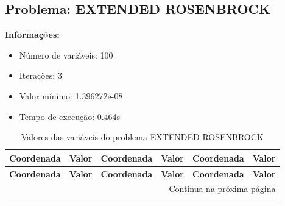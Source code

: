 \documentclass[12pt]{article}
\begin{document}
\newpage            
\subsection{Problema: EXTENDED ROSENBROCK}

\textbf{Informações:}
\begin{itemize}
\item Número de variáveis: 100
\item Iterações: 3
\item Valor mínimo: 1.396272e-08
\item Tempo de execução: 0.464s
\end{itemize}

\small
\begin{longtable}{@{}cc|cc|cc@{}}
\caption{Valores das variáveis do problema EXTENDED ROSENBROCK} \\
\toprule
\textbf{Coordenada} & \textbf{Valor} & \textbf{Coordenada} & \textbf{Valor} & \textbf{Coordenada} & \textbf{Valor} \\
\midrule
\endfirsthead

\toprule
\textbf{Coordenada} & \textbf{Valor} & \textbf{Coordenada} & \textbf{Valor} & \textbf{Coordenada} & \textbf{Valor} \\
\midrule
\endhead

\midrule \multicolumn{6}{r}{{Continua na próxima página}} \\ \midrule
\endfoot


\end{longtable}
\end{document}
